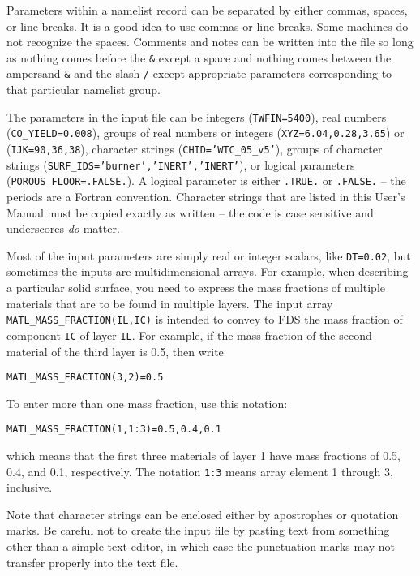 \documentclass[11pt]{book}
\newcommand{\ct}{\tt\small}
\begin{document}
Parameters within a namelist record can be separated by either commas, spaces, or line breaks. It is a good idea to use
commas or line breaks. Some machines do not recognize the spaces.
Comments and notes can be written into the file so long as nothing comes
before the {\ct \&} except a space and nothing comes between the ampersand
{\ct \&} and the slash {\ct /} except appropriate parameters corresponding
to that particular namelist group.

The parameters in the input file can be integers ({\ct TWFIN=5400}),
real numbers ({\ct CO\_YIELD=0.008}), groups of real numbers or integers
({\ct XYZ=6.04,0.28,3.65}) or ({\ct IJK=90,36,38}),
character strings ({\ct CHID='WTC\_05\_v5'}), groups of character strings
({\ct SURF\_IDS='burner','INERT','INERT'}),
or logical parameters ({\ct POROUS\_FLOOR=.FALSE.}). A logical parameter is either
{\ct .TRUE.} or {\ct .FALSE.} -- the periods are a
Fortran convention. Character strings that are listed in
this User's Manual must be copied exactly as written -- the code
is case sensitive and underscores {\em do} matter.

Most of the input parameters are simply real or integer scalars, like {\ct DT=0.02}, but sometimes the inputs are
multidimensional arrays. For example, when describing a particular solid surface, you need to express the mass
fractions of multiple materials that are to be found in multiple layers. The input array {\ct MATL\_MASS\_FRACTION(IL,IC)} is
intended to convey to FDS the mass fraction of component {\ct IC} of layer {\ct IL}. For example, if the mass fraction of the
second material of the third layer is 0.5, then write

{\ct MATL\_MASS\_FRACTION(3,2)=0.5}

\noindent
To enter more than one mass fraction, use
this notation:

{\ct MATL\_MASS\_FRACTION(1,1:3)=0.5,0.4,0.1}

\noindent
which means that the first three materials of layer 1 have
mass fractions of 0.5, 0.4, and 0.1, respectively. The notation {\ct 1:3} means array element 1 through 3, inclusive.



\begin{warning}
\noindent
Note that character strings can be enclosed either by apostrophes or quotation marks.
Be careful not to create the input file by pasting text from something other than a
simple text editor, in which case the punctuation marks may not transfer
properly into the text file.
\end{warning}
\end{document}
